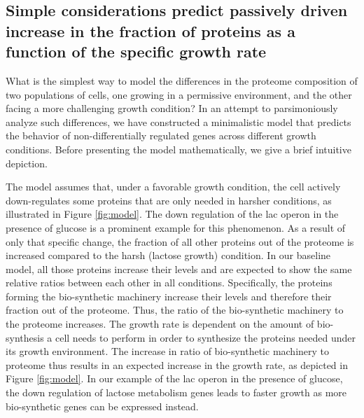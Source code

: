 \subsection{Simple considerations predict passively driven increase in the fraction of proteins as a function of the specific growth rate}
What is the simplest way to model the differences in the proteome composition of two populations of cells, one growing in a permissive environment, and the other facing a more challenging growth condition?
In an attempt to parsimoniously analyze such differences, we have constructed a minimalistic model that predicts the behavior of non-differentially regulated genes across different growth conditions.
Before presenting the model mathematically, we give a brief intuitive depiction.

The model assumes that, under a favorable growth condition, the cell actively down-regulates some proteins that are only needed in harsher conditions, as illustrated in Figure \ref{fig:model}.
The down regulation of the lac operon in the presence of glucose is a prominent example for this phenomenon. 
As a result of only that specific change, the fraction of all other proteins out of the proteome is increased compared to the harsh (lactose growth) condition.
In our baseline model, all those proteins increase their levels and are expected to show the same relative ratios between each other in all conditions. 
Specifically, the proteins forming the bio-synthetic machinery increase their levels and therefore their fraction out of the proteome.
Thus, the ratio of the bio-synthetic machinery to the proteome increases.
The growth rate is dependent on the amount of bio-synthesis a cell needs to perform in order to synthesize the proteins needed under its growth environment.
The increase in ratio of bio-synthetic machinery to proteome thus results in an expected increase in the growth rate, as  depicted in Figure \ref{fig:model}.
In our example of the lac operon in the presence of glucose, the down regulation of lactose metabolism genes leads to faster growth as more bio-synthetic genes can be expressed instead.